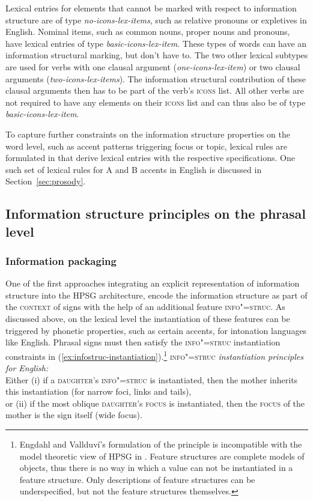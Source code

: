 \documentclass[output=paper
	        ,collection
	        ,collectionchapter
 	        ,biblatex
                ,babelshorthands
                ,newtxmath
                ,draftmode
                ,colorlinks, citecolor=brown
]{langscibook}
\begin{document}
Lexical entries for elements that cannot be marked with respect to
information structure are of type \textit{no-icons-lex-items}, such as
relative pronouns or expletives in English.  Nominal items, such as
common nouns, proper nouns and pronouns, have lexical entries of type
\textit{basic-icons-lex-item}. These types of words can have an
information structural marking, but don't have to. The two other
lexical subtypes are used for verbs with one clausal argument
(\textit{one-icons-lex-item}) or two clausal arguments
(\textit{two-icons-lex-items}). The information structural
contribution of these clausal arguments then has to be part of the
verb's \textsc{icons} list. All other verbs are not required to have any
elements on their \textsc{icons} list and can thus also be of type
\textit{basic-icons-lex-item}.

To capture further constraints on the information structure properties
on the word level, such as accent patterns triggering focus or topic,
lexical rules are formulated in \cite{song2018} that derive lexical entries with the
respective specifications. One such set of lexical rules for A and B
accents in English is discussed in Section~\ref{sec:prosody}.


\subsection{Information structure principles on the phrasal level}
\label{sec:infostruc-phrase}

\subsubsection{Information packaging \citep{EV96a}}

One of the first approaches integrating an explicit representation of
information structure into the HPSG architecture, \cite{EV96a} encode
the information structure as part of the  \textsc{context} of signs
with the help of an additional feature \textsc{info"=struc}. As
discussed above, on the lexical level the instantiation of these
features can be triggered by phonetic properties, such as certain
accents, for intonation languages like English. Phrasal signs must
then satisfy the \textsc{info"=struc} instantiation constraints in
(\ref{ex:infostruc-instantiation}).\footnote{Engdahl and Vallduví’s formulation of
the principle is incompatible with the model theoretic view of HPSG in \cite{ps2}.
Feature structures are complete models of objects, thus there is no way
in which a value can not be instantiated in a feature structure. Only descriptions
of feature structures can be underspecified, but not the feature
structures themselves.}
\ea
\label{ex:infostruc-instantiation} \textsc{info"=struc} \textit{instantiation principles for English:}\\
Either (i) if a \textsc{daughter}'s \textsc{info"=struc} is instantiated, then the mother inherits this instantiation (for narrow foci, links and tails),\\
or (ii) if the most oblique \textsc{daughter}'s \textsc{focus} is instantiated, then the \textsc{focus} of the mother is the sign itself (wide focus).
\z
\end{document}
